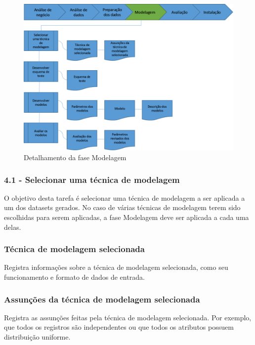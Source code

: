 \begin{figure}[H]
	\includegraphics[scale=0.8]{img/CRISP-DM-Modelagem.png}
	\caption{Detalhamento da fase Modelagem}
	\label{img:CRISP-DM-Modelagem}
\end{figure}


\subsubsection*{\textbf{4.1 - Selecionar uma técnica de modelagem}}

O objetivo desta tarefa é selecionar uma técnica de modelagem a ser aplicada a um dos datasets gerados. No caso de várias técnicas de modelagem terem sido escolhidas para serem aplicadas, a fase Modelagem deve ser aplicada a cada uma delas.

\subsubsection*{Técnica de modelagem selecionada}

Registra informações sobre a técnica de modelagem selecionada, como seu funcionamento e formato de dados de entrada.

\subsubsection*{Assunções da técnica de modelagem selecionada}

Registra as assunções feitas pela técnica de modelagem selecionada. Por exemplo, que todos os registros são independentes ou que todos os atributos possuem distribuição uniforme.

